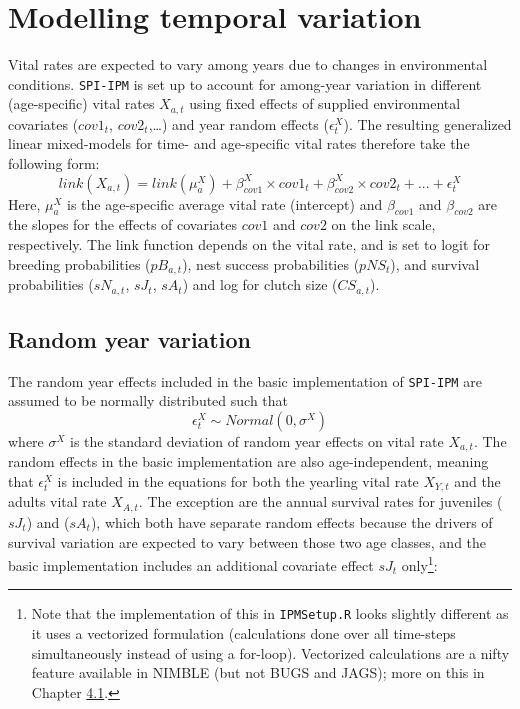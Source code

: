 \documentclass[
]{book}
\begin{document}
\hypertarget{TempVar}{%
\chapter{Modelling temporal variation}\label{TempVar}}

Vital rates are expected to vary among years due to changes in environmental
conditions. \texttt{SPI-IPM} is set up to account for among-year variation in
different (age-specific) vital rates \(X_{a,t}\) using fixed effects of
supplied environmental covariates (\(cov1_t\), \(cov2_t\),\ldots) and year random effects (\(\epsilon_t^X\)). The resulting generalized linear
mixed-models for time- and age-specific vital rates therefore take the following
form:
\begin{equation}
  link(X_{a,t}) = link(\mu_a^X) + \beta_{cov1}^X\times cov1_t + \beta_{cov2}^X\times cov2_t + ... + \epsilon_t^X
\end{equation}
Here, \(\mu_a^X\) is the age-specific average vital rate (intercept) and \(\beta_{cov1}\)
and \(\beta_{cov2}\) are the slopes for the effects of covariates \(cov1\) and \(cov2\)
on the link scale, respectively.
The link function depends on the vital rate, and is set to logit for breeding
probabilities (\(pB_{a,t}\)), nest success probabilities (\(pNS_t\)), and survival
probabilities (\(sN_{a,t}\), \(sJ_t\), \(sA_t\)) and log for clutch size (\(CS_{a,t}\)).

\hypertarget{random-year-variation}{%
\section{Random year variation}\label{random-year-variation}}

The random year effects included in the basic implementation of \texttt{SPI-IPM} are
assumed to be normally distributed such that
\begin{equation}
  \epsilon_{t}^X \sim Normal(0, \sigma^X)
\end{equation}
where \(\sigma^X\) is the standard deviation of random year effects on vital rate
\(X_{a,t}\).
The random effects in the basic implementation are also age-independent, meaning
that \(\epsilon_t^X\) is included in the equations for both the yearling vital
rate \(X_{Y,t}\) and the adults vital rate \(X_{A,t}\). The exception are the annual
survival rates for juveniles (\(sJ_t\)) and (\(sA_t\)), which both have separate
random effects because the drivers of survival variation are expected to vary
between those two age classes, and the basic implementation includes an
additional covariate effect \(sJ_t\) only\footnote{Note that the implementation of this
  in \texttt{IPMSetup.R} looks slightly different as it uses a vectorized formulation
  (calculations done over all time-steps simultaneously instead of using a
  for-loop). Vectorized calculations are a nifty feature available in NIMBLE (but
  not BUGS and JAGS); more on this in Chapter \protect\hyperlink{ux5cux23ux5cux2520Efficientux5cux2520implementationux5cux2520usingux5cux2520NIMBLE}{4.1}.}:
\end{document}
